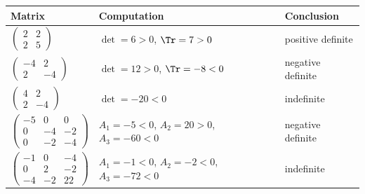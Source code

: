 \begin{example}
\begin{center}
\begin{tabular}{lll}
\textbf{Matrix} & \textbf{Computation} & \textbf{Conclusion} \\
\hline
$\left(\begin{smallmatrix}2&2\\2&5\end{smallmatrix}\right)$ & $\det = 6 > 0$, $\Tr = 7 > 0$ & positive definite \\
$\left(\begin{smallmatrix}-4&2\\2&-4\end{smallmatrix}\right)$ & $\det = 12 > 0$, $\Tr = -8 < 0$ & negative definite \\
$\left(\begin{smallmatrix}4&2\\2&-4\end{smallmatrix}\right)$ & $\det = -20 < 0$ & indefinite \\
$\left(\begin{smallmatrix}-5&0&0\\0&-4&-2\\0&-2&-4\end{smallmatrix}\right)$ & $A_1 = -5 < 0$, $A_2 = 20 > 0$, $A_3 = -60 < 0$ & negative definite \\
$\left(\begin{smallmatrix}-1&0&-4\\0&2&-2\\-4&-2&22\end{smallmatrix}\right)$ & $A_1 = -1 < 0$, $A_2 = -2 < 0$, $A_3 = -72 < 0$ & indefinite \\
\end{tabular}
\end{center}
\end{example}

